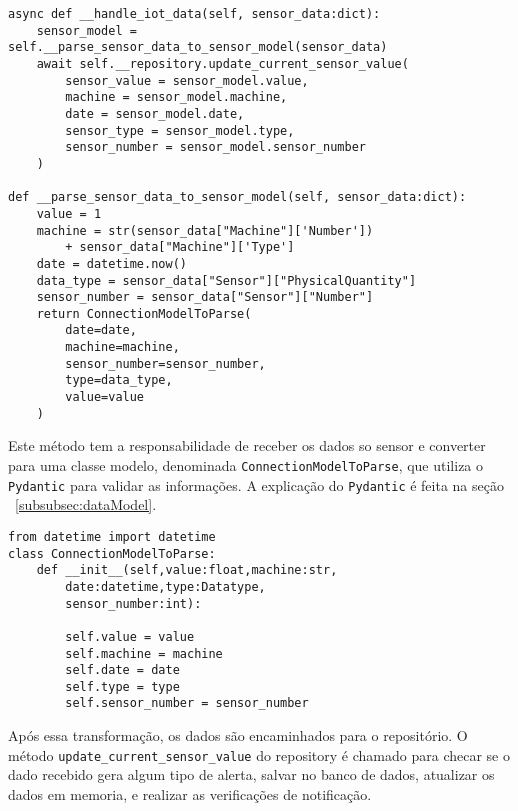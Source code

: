 \begin{verbatim}
async def __handle_iot_data(self, sensor_data:dict):
    sensor_model = self.__parse_sensor_data_to_sensor_model(sensor_data)
    await self.__repository.update_current_sensor_value(
        sensor_value = sensor_model.value,
        machine = sensor_model.machine,
        date = sensor_model.date,
        sensor_type = sensor_model.type,
        sensor_number = sensor_model.sensor_number
    )

def __parse_sensor_data_to_sensor_model(self, sensor_data:dict):
    value = 1
    machine = str(sensor_data["Machine"]['Number']) 
        + sensor_data["Machine"]['Type']
    date = datetime.now()
    data_type = sensor_data["Sensor"]["PhysicalQuantity"]
    sensor_number = sensor_data["Sensor"]["Number"]
    return ConnectionModelToParse(
        date=date,
        machine=machine,
        sensor_number=sensor_number,
        type=data_type,
        value=value
    )
\end{verbatim}

Este método tem a responsabilidade de receber os dados so sensor e converter para uma classe modelo, denominada \texttt{ConnectionModelToParse}, que utiliza o \texttt{Pydantic} para validar as informações. A explicação do \texttt{Pydantic} é feita na seção ~\ref{subsubsec:dataModel}.

\begin{verbatim}
from datetime import datetime
class ConnectionModelToParse:
    def __init__(self,value:float,machine:str,
        date:datetime,type:Datatype,
        sensor_number:int):

        self.value = value
        self.machine = machine
        self.date = date
        self.type = type
        self.sensor_number = sensor_number
\end{verbatim}

Após essa transformação, os dados são encaminhados para o repositório. O método \texttt{update\_current\_sensor\_value} do repository é chamado para checar se o dado recebido gera algum tipo de alerta, salvar no banco de dados, atualizar os dados em memoria, e realizar as verificações de notificação.

